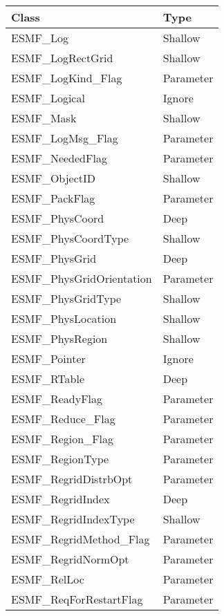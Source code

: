 \begin{table}[t]
\begin{tabular}{ll}

{\bf Class} & {\bf Type} \\ \hline

ESMF\_Log                   & Shallow\\
ESMF\_LogRectGrid           & Shallow\\
ESMF\_LogKind\_Flag               & Parameter \\
ESMF\_Logical               & Ignore\\
ESMF\_Mask                  & Shallow\\
ESMF\_LogMsg\_Flag               & Parameter \\
ESMF\_NeededFlag            & Parameter \\
ESMF\_ObjectID              & Shallow\\
ESMF\_PackFlag              & Parameter \\
ESMF\_PhysCoord             & Deep \\
ESMF\_PhysCoordType         & Shallow\\
ESMF\_PhysGrid              & Deep \\
ESMF\_PhysGridOrientation   & Parameter \\
ESMF\_PhysGridType          & Shallow\\
ESMF\_PhysLocation          & Shallow\\
ESMF\_PhysRegion            & Shallow\\
ESMF\_Pointer               & Ignore\\
ESMF\_RTable                & Deep \\
ESMF\_ReadyFlag             & Parameter \\
ESMF\_Reduce\_Flag            & Parameter \\
ESMF\_Region\_Flag            & Parameter \\
ESMF\_RegionType            & Parameter \\
ESMF\_RegridDistrbOpt       & Parameter \\
ESMF\_RegridIndex           & Deep \\
ESMF\_RegridIndexType       & Shallow\\
ESMF\_RegridMethod\_Flag    & Parameter \\
ESMF\_RegridNormOpt         & Parameter \\
ESMF\_RelLoc                & Parameter \\
ESMF\_ReqForRestartFlag     & Parameter \\

\end{tabular}
\end{table}
